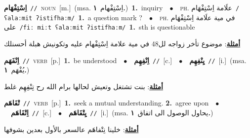 \documentclass[10pt,a4paper,twoside]{article} %
\begin{document}
\begin{multicols}{2}
{\setlength\topsep{0pt}\textbf{\foreignlanguage{arabic}{اِسْتِفْهَام}}\ {\color{gray}\texttt{//}\color{black}}\ \textsc{noun}\ [m.]\ \color{gray}(msa. \foreignlanguage{arabic}{اِسْتِفْهام}~\foreignlanguage{arabic}{\textbf{١.}})\color{black}\ \textbf{1.}~inquiry\ \ $\bullet$\ \ \textsc{ph.} \color{gray} \foreignlanguage{arabic}{علَامة اِسْتِفْهَام}\color{black}\ {\color{gray}\texttt{/{\sffamily ʕalaːmit ʔistifhaːm}/}\color{black}}\ \textbf{1.}~a question mark ?\ \ $\bullet$\ \ \textsc{ph.} \color{gray} \foreignlanguage{arabic}{في مية علَامة اِسْتِفْهَام على}\color{black}\ {\color{gray}\texttt{/{\sffamily fiː miːt ʕalaːmit ʔistifhaːm}/}\color{black}}\ \textbf{1.}~sth is questionable\  \begin{flushright}\color{gray}\foreignlanguage{arabic}{\textbf{\underline{\foreignlanguage{arabic}{أمثلة}}}: موضوع تأخر زواجه لل48 في مية علامة اِسْتِفْهام عليه وتكونيش هبلة أحسنلك}\end{flushright}\color{black}} \vspace{2mm}

{\setlength\topsep{0pt}\textbf{\foreignlanguage{arabic}{اِنْفَهَم}}\ {\color{gray}\texttt{//}\color{black}}\ \textsc{verb}\ [p.]\ \textbf{1.}~be understood\ \ $\bullet$\ \ \setlength\topsep{0pt}\textbf{\foreignlanguage{arabic}{اِنْفِهِم}}\ {\color{gray}\texttt{//}\color{black}}\ [c.]\ \ $\bullet$\ \ \setlength\topsep{0pt}\textbf{\foreignlanguage{arabic}{يِنْفِهِم}}\ {\color{gray}\texttt{//}\color{black}}\ [i.]\ \color{gray}(msa. \foreignlanguage{arabic}{يُفْهَم}~\foreignlanguage{arabic}{\textbf{١.}})\color{black}\  \begin{flushright}\color{gray}\foreignlanguage{arabic}{\textbf{\underline{\foreignlanguage{arabic}{أمثلة}}}: بنت تشتغل وتعيش لحالها برام الله رح تِنْفِهِم غلط}\end{flushright}\color{black}} \vspace{2mm}

{\setlength\topsep{0pt}\textbf{\foreignlanguage{arabic}{تْفَاهَم}}\ {\color{gray}\texttt{//}\color{black}}\ \textsc{verb}\ [p.]\ \textbf{1.}~seek a mutual understanding.  \textbf{2.}~agree upon\ \ $\bullet$\ \ \setlength\topsep{0pt}\textbf{\foreignlanguage{arabic}{اِتْفَاهَم}}\ {\color{gray}\texttt{//}\color{black}}\ [c.]\ \ $\bullet$\ \ \setlength\topsep{0pt}\textbf{\foreignlanguage{arabic}{يِتْفَاهَم}}\ {\color{gray}\texttt{//}\color{black}}\ [i.]\ \color{gray}(msa. \foreignlanguage{arabic}{يحاول الوصول الى اتفاق}~\foreignlanguage{arabic}{\textbf{١.}})\color{black}\  \begin{flushright}\color{gray}\foreignlanguage{arabic}{\textbf{\underline{\foreignlanguage{arabic}{أمثلة}}}: خلينا نِتْفاهَم عالسعر بالأول بعدين بشوفها}\end{flushright}\color{black}} \vspace{2mm}


\end{multicols}
\end{document}
